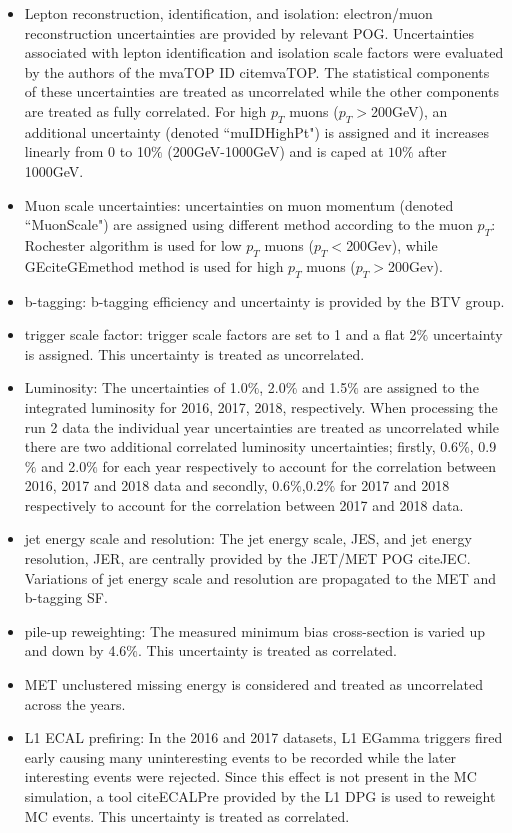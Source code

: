 \begin{itemize}
\item Lepton reconstruction, identification, and isolation: electron/muon reconstruction uncertainties are provided by relevant POG. Uncertainties associated with lepton identification and isolation scale factors were evaluated by the authors of the mvaTOP ID cite{mvaTOP}. The statistical components of these uncertainties are treated as uncorrelated while the other components are treated as fully correlated. For high $p_{T}$ muons ($p_{T}>$200GeV), an additional uncertainty (denoted ``muIDHighPt") is assigned and it increases linearly from 0 to 10$\%$ (200GeV-1000GeV) and is caped at $10\%$ after 1000GeV.
\item Muon scale uncertainties: uncertainties on muon momentum (denoted ``MuonScale") are assigned using different method according to the muon $p_{T}$: Rochester algorithm is used for low $p_{T}$ muons ($p_{T}<$200Gev), while GEcite{GEmethod} method is used for high $p_T$ muons ($p_{T}>$200Gev).
\item b-tagging: b-tagging efficiency and uncertainty is provided by the BTV group. 
\item trigger scale factor: trigger scale factors are set to 1 and a flat 2$\%$ uncertainty is assigned. This uncertainty is treated as uncorrelated.
\item Luminosity: The uncertainties of 1.0$\%$, 2.0$\%$ and 1.5$\%$  are assigned to the integrated luminosity for 2016, 2017, 2018, respectively. When processing the run 2 data the individual year uncertainties are treated as uncorrelated while there are two additional correlated luminosity uncertainties; firstly, 0.6$\%$, 0.9$\%$ and 2.0$\%$ for each year respectively to account for the correlation between 2016, 2017 and 2018 data and secondly, 0.6$\%$,0.2$\%$ for 2017 and 2018 respectively to account for the correlation between 2017 and 2018 data. 
\item jet energy scale and resolution: The jet energy scale, JES, and jet energy resolution, JER, are centrally provided by the JET/MET POG cite{JEC}. Variations of jet energy scale and resolution are propagated to the MET and b-tagging SF.
\item pile-up reweighting: The measured minimum bias cross-section is varied up and down by 4.6$\%$. This uncertainty is treated as correlated. 
\item MET unclustered missing energy is considered and treated as uncorrelated across the years.
\item L1 ECAL prefiring: In the 2016 and 2017 datasets, L1 EGamma triggers fired early causing many uninteresting events to be recorded while the later interesting events were rejected. Since this effect is not present in the MC simulation, a tool cite{ECALPre} provided by the L1 DPG is used to reweight MC events. This uncertainty is treated as correlated. 

\end{itemize}
